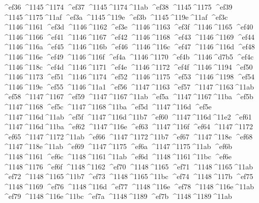 \checkit ^^^^ef36 ^^^^1145^^^^1174
\checkit ^^^^ef37 ^^^^1145^^^^1174^^^^11ab
\checkit ^^^^ef38 ^^^^1145^^^^1175
\checkit ^^^^ef39 ^^^^1145^^^^1175^^^^11af
\checkit ^^^^ef3a ^^^^1145^^^^119e
\checkit ^^^^ef3b ^^^^1145^^^^119e^^^^11af
\checkit ^^^^ef3c ^^^^1146^^^^1161
\checkit ^^^^ef3d ^^^^1146^^^^1162
\checkit ^^^^ef3e ^^^^1146^^^^1163
\checkit ^^^^ef3f ^^^^1146^^^^1165
\checkit ^^^^ef40 ^^^^1146^^^^1166
\checkit ^^^^ef41 ^^^^1146^^^^1167
\checkit ^^^^ef42 ^^^^1146^^^^1168
\checkit ^^^^ef43 ^^^^1146^^^^1169
\checkit ^^^^ef44 ^^^^1146^^^^116a
\checkit ^^^^ef45 ^^^^1146^^^^116b
\checkit ^^^^ef46 ^^^^1146^^^^116c
\checkit ^^^^ef47 ^^^^1146^^^^116d
\checkit ^^^^ef48 ^^^^1146^^^^116e
\checkit ^^^^ef49 ^^^^1146^^^^116f
\checkit ^^^^ef4a ^^^^1146^^^^1170
\checkit ^^^^ef4b ^^^^1146^^^^d7b5
\checkit ^^^^ef4c ^^^^1146^^^^118c
\checkit ^^^^ef4d ^^^^1146^^^^1171
\checkit ^^^^ef4e ^^^^1146^^^^1172
\checkit ^^^^ef4f ^^^^1146^^^^1194
\checkit ^^^^ef50 ^^^^1146^^^^1173
\checkit ^^^^ef51 ^^^^1146^^^^1174
\checkit ^^^^ef52 ^^^^1146^^^^1175
\checkit ^^^^ef53 ^^^^1146^^^^1198
\checkit ^^^^ef54 ^^^^1146^^^^119e
\checkit ^^^^ef55 ^^^^1146^^^^11a1
\checkit ^^^^ef56 ^^^^1147^^^^1163
\checkit ^^^^ef57 ^^^^1147^^^^1163^^^^11ab
\checkit ^^^^ef58 ^^^^1147^^^^1167
\checkit ^^^^ef59 ^^^^1147^^^^1167^^^^11ab
\checkit ^^^^ef5a ^^^^1147^^^^1167^^^^11ba
\checkit ^^^^ef5b ^^^^1147^^^^1168
\checkit ^^^^ef5c ^^^^1147^^^^1168^^^^11ba
\checkit ^^^^ef5d ^^^^1147^^^^116d
\checkit ^^^^ef5e ^^^^1147^^^^116d^^^^11ab
\checkit ^^^^ef5f ^^^^1147^^^^116d^^^^11b7
\checkit ^^^^ef60 ^^^^1147^^^^116d^^^^11e2
\checkit ^^^^ef61 ^^^^1147^^^^116d^^^^11ba
\checkit ^^^^ef62 ^^^^1147^^^^116e
\checkit ^^^^ef63 ^^^^1147^^^^116f
\checkit ^^^^ef64 ^^^^1147^^^^1172
\checkit ^^^^ef65 ^^^^1147^^^^1172^^^^11ab
\checkit ^^^^ef66 ^^^^1147^^^^1172^^^^11b7
\checkit ^^^^ef67 ^^^^1147^^^^118e
\checkit ^^^^ef68 ^^^^1147^^^^118e^^^^11ab
\checkit ^^^^ef69 ^^^^1147^^^^1175
\checkit ^^^^ef6a ^^^^1147^^^^1175^^^^11ab
\checkit ^^^^ef6b ^^^^1148^^^^1161
\checkit ^^^^ef6c ^^^^1148^^^^1161^^^^11ab
\checkit ^^^^ef6d ^^^^1148^^^^1161^^^^11bc
\checkit ^^^^ef6e ^^^^1148^^^^1176
\checkit ^^^^ef6f ^^^^1148^^^^1162
\checkit ^^^^ef70 ^^^^1148^^^^1165
\checkit ^^^^ef71 ^^^^1148^^^^1165^^^^11ab
\checkit ^^^^ef72 ^^^^1148^^^^1165^^^^11b7
\checkit ^^^^ef73 ^^^^1148^^^^1165^^^^11bc
\checkit ^^^^ef74 ^^^^1148^^^^117b
\checkit ^^^^ef75 ^^^^1148^^^^1169
\checkit ^^^^ef76 ^^^^1148^^^^116d
\checkit ^^^^ef77 ^^^^1148^^^^116e
\checkit ^^^^ef78 ^^^^1148^^^^116e^^^^11ab
\checkit ^^^^ef79 ^^^^1148^^^^116e^^^^11bc
\checkit ^^^^ef7a ^^^^1148^^^^1189
\checkit ^^^^ef7b ^^^^1148^^^^1189^^^^11ab
